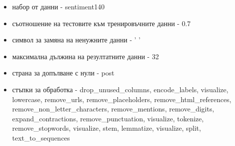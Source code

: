 \documentclass{article}
\begin{document}
\begin{itemize}
\begin{itemize}
\item набор от данни - sentiment140
\item съотношение на тестовите към тренировъчните данни - 0.7
\item символ за замяна на ненужните данни - ' '
\item максимална дължина на резултатните данни - 32
\item страна за допълване с нули - post
\item стъпки за обработка - drop\_unused\_columns, encode\_labels, visualize, lowercase, remove\_urls,
remove\_placeholders, remove\_html\_references, remove\_non\_letter\_characters, remove\_mentions,
remove\_digits, expand\_contractions, remove\_punctuation, visualize, tokenize, remove\_stopwords, visualize,
stem, lemmatize, visualize, split, text\_to\_sequences
\end{itemize}


\end{itemize}
\end{document}

